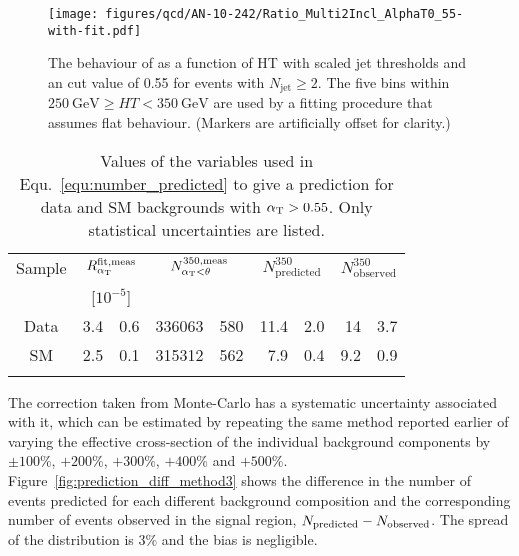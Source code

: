 \begin{figure}[!h]
  \begin{center} 
    \texttt{[image: figures/qcd/AN-10-242/Ratio\_Multi2Incl\_AlphaT0\_55-with-fit.pdf]}
    \caption{\label{fig:ratio_with_fit} The behaviour of \RaT as a
      function of HT with scaled jet \pt thresholds and an \aT cut
      value of 0.55 for events with $N_{\mathrm{jet}} \geq 2$. The
      five bins within $250~\mathrm{GeV} \geq HT < 350~\mathrm{GeV}$
      are used by a fitting procedure that assumes flat
      behaviour. (Markers are artificially offset for clarity.)}
  \end{center}
\end{figure}

\medskip
\begin{table}[!h]
  \begin{center}
    \caption{\label{tab:check_prediction} Values of the variables used
      in Equ.~\ref{equ:number_predicted} to give a prediction for data
      and SM backgrounds with $\alpha_{\mathrm{T}} > 0.55$. Only statistical
      uncertainties are listed.}
    \begin{tabular}{cr@{$\ \pm\ $}lr@{$\ \pm\ $}lr@{$\ \pm\ $}lr@{$\ \pm\ $}l}
      \hline\noalign{\smallskip}
      Sample &
      \multicolumn{2}{c}{$R^{\mathrm{fit},\mathrm{meas}}_{\alpha_{\mathrm{T}}}$} &
      \multicolumn{2}{c}{$N^{350,\mathrm{meas}}_{\alpha_{\mathrm{T}}<\theta}$} &
      \multicolumn{2}{c}{$N^{350}_{\mathrm{predicted}}$} &
      \multicolumn{2}{c}{$N^{350}_{\mathrm{observed}}$} \\
      &
      \multicolumn{2}{c}{[$10^{-5}$]} &
      \multicolumn{2}{c}{} &
      \multicolumn{2}{c}{} &
      \multicolumn{2}{c}{} \\
      \noalign{\smallskip}\hline\noalign{\smallskip}
      Data & 
      3.4&0.6 & 
      336063&580 & 
      11.4&2.0 &
      14&3.7 \\
      SM &
      2.5&0.1 &
      315312&562 &
      7.9&0.4 &
      9.2&0.9 \\
      \noalign{\smallskip}\hline
    \end{tabular}
  \end{center}
\end{table}

The correction taken from Monte-Carlo has a systematic uncertainty
associated with it, which can be estimated by repeating the same
method reported earlier of varying the effective cross-section of the
individual background components by $\pm100\%$, $+200\%$, $+300\%$,
$+400\%$ and $+500\%$. Figure~\ref{fig:prediction_diff_method3} shows
the difference in the number of events predicted for each different
background composition and the corresponding number of events observed
in the signal region, $N_{\mathrm{predicted}} - N_{\mathrm{observed}}$. The spread of the distribution
is $3\%$ and the bias is negligible.

